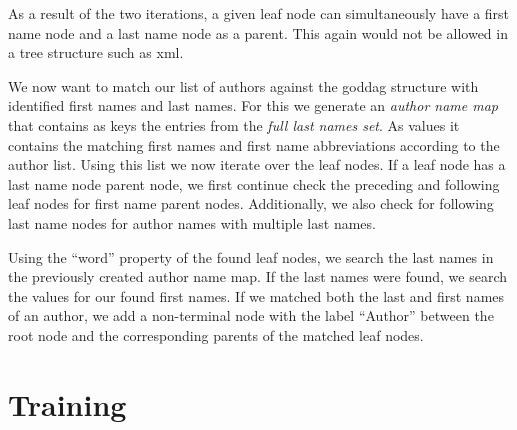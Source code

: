 As a result of the two iterations, a given leaf node can simultaneously have a first name node and a last name node as a parent.
This again would not be allowed in a tree structure such as \gls{xml}.

We now want to match our list of authors against the \gls{goddag} structure with identified first names and last names.
For this we generate an \textit{author name map} that contains as keys the entries from the \textit{full last names set}.
As values it contains the matching first names and first name abbreviations according to the author list.
Using this list we now iterate over the leaf nodes.
If a leaf node has a last name node parent node, we first continue check the preceding and following leaf nodes for first name parent nodes.
Additionally, we also check for following last name nodes for author names with multiple last names.

Using the ``word'' property of the found leaf nodes, we search the last names in the previously created author name map.
If the last names were found, we search the values for our found first names.
If we matched both the last and first names of an author, we add a non-terminal node with the label ``Author'' between the root node and the corresponding parents of the matched leaf nodes.





\section{Training }\label{sec:ae-training-crfs}

